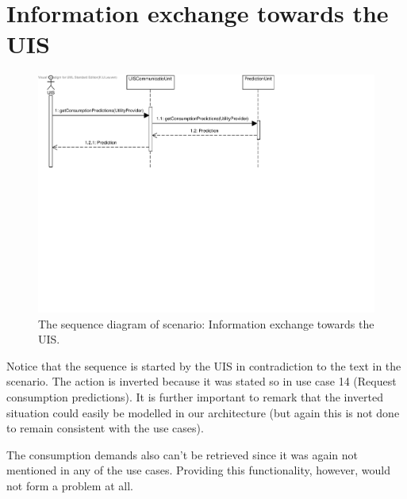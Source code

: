 \section{Information exchange towards the UIS}

\begin{figure}
	\begin{centering}
		\includegraphics[width=\textwidth]{figs/scenario-5-8.pdf}
		\caption{The sequence diagram of scenario: Information exchange towards the
		UIS.}
		\label{fig:scenario-5-8}
	\end{centering}
\end{figure}

\npar Notice that the sequence is started by the UIS in contradiction to the
text in the scenario. The action is inverted because it was stated so in use
case 14 (Request consumption predictions). It is further important to remark
that the inverted situation could easily be modelled in our architecture (but
again this is not done to remain consistent with the use cases).

\npar The consumption demands also can't be retrieved since it was again not
mentioned in any of the use cases. Providing this functionality, however, would
not form a problem at all.

